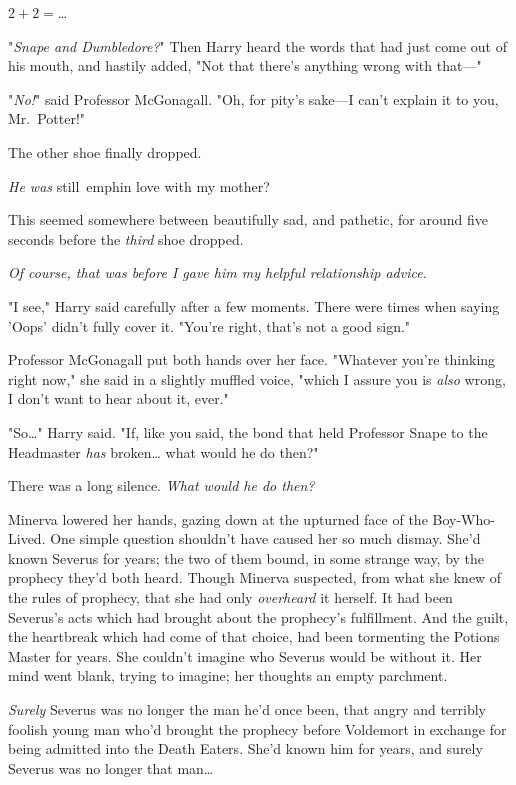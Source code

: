 $2 + 2 = ${\ldots}

"\emph{Snape and Dumbledore?}" Then Harry heard the words that had just come 
out of his mouth, and hastily added, "Not that there's anything wrong with 
that---"

"\emph{No!}" said Professor McGonagall. "Oh, for pity's sake---I can't explain 
it to you, Mr.~Potter!"

The other shoe finally dropped.

\emph{He was} still\ emph{in love with my mother?}

This seemed somewhere between beautifully sad, and pathetic, for around five 
seconds before the \emph{third} shoe dropped.

\emph{Of course, that was before I gave him my helpful relationship advice.}

"I see," Harry said carefully after a few moments. There were times when saying 
'Oops' didn't fully cover it. "You're right, that's not a good sign."

Professor McGonagall put both hands over her face. "Whatever you're thinking 
right now," she said in a slightly muffled voice, "which I assure you is 
\emph{also} wrong, I don't want to hear about it, ever."

"So{\ldots}" Harry said. "If, like you said, the bond that held Professor Snape 
to the Headmaster \emph{has} broken{\ldots} what would he do then?"

There was a long silence.
\sbreak
\emph{What would he do then?}

Minerva lowered her hands, gazing down at the upturned face of the 
Boy-Who-Lived. One simple question shouldn't have caused her so much dismay. 
She'd known Severus for years; the two of them bound, in some strange way, by 
the prophecy they'd both heard. Though Minerva suspected, from what she knew of 
the rules of prophecy, that she had only \emph{overheard} it herself. It had 
been Severus's acts which had brought about the prophecy's fulfillment. And the 
guilt, the heartbreak which had come of that choice, had been tormenting the 
Potions Master for years. She couldn't imagine who Severus would be without it. 
Her mind went blank, trying to imagine; her thoughts an empty parchment.

\emph{Surely} Severus was no longer the man he'd once been, that angry and 
terribly foolish young man who'd brought the prophecy before Voldemort in 
exchange for being admitted into the Death Eaters. She'd known him for years, 
and surely Severus was no longer that man{\ldots}

